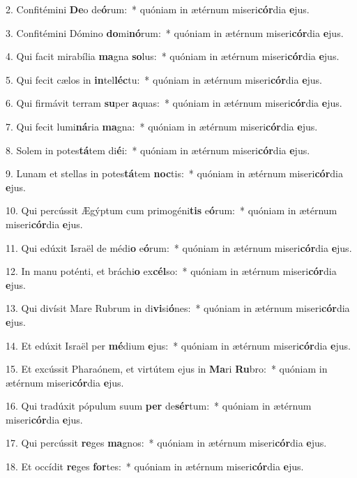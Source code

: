 2. Confitémini \textbf{De}o de\textbf{ó}rum:~*  quóniam in ætérnum miseri\textbf{cór}dia \textbf{e}jus.\

3. Confitémini Dómino \textbf{do}mi\textbf{nó}rum:~*  quóniam in ætérnum miseri\textbf{cór}dia \textbf{e}jus.\

4. Qui facit mirabília \textbf{ma}gna \textbf{so}lus:~*  quóniam in ætérnum miseri\textbf{cór}dia \textbf{e}jus.\

5. Qui fecit cælos in \textbf{in}tel\textbf{léc}tu:~*  quóniam in ætérnum miseri\textbf{cór}dia \textbf{e}jus.\

6. Qui firmávit terram \textbf{su}per \textbf{a}quas:~*  quóniam in ætérnum miseri\textbf{cór}dia \textbf{e}jus.\

7. Qui fecit lumi\textbf{ná}ria \textbf{ma}gna:~*  quóniam in ætérnum miseri\textbf{cór}dia \textbf{e}jus.\

8. Solem in potes\textbf{tá}tem di\textbf{é}i:~*  quóniam in ætérnum miseri\textbf{cór}dia \textbf{e}jus.\

9. Lunam et stellas in potes\textbf{tá}tem \textbf{noc}tis:~*  quóniam in ætérnum miseri\textbf{cór}dia \textbf{e}jus.\

10. Qui percússit Ægýptum cum primogéni\textbf{tis} e\textbf{ó}rum:~*  quóniam in ætérnum miseri\textbf{cór}dia \textbf{e}jus.\

11. Qui edúxit Israël de médi\textbf{o} e\textbf{ó}rum:~*  quóniam in ætérnum miseri\textbf{cór}dia \textbf{e}jus.\

12. In manu poténti, et bráchi\textbf{o} ex\textbf{cél}so:~*  quóniam in ætérnum miseri\textbf{cór}dia \textbf{e}jus.\

13. Qui divísit Mare Rubrum in di\textbf{vi}si\textbf{ó}nes:~*  quóniam in ætérnum miseri\textbf{cór}dia \textbf{e}jus.\

14. Et edúxit Israël per \textbf{mé}dium \textbf{e}jus:~*  quóniam in ætérnum miseri\textbf{cór}dia \textbf{e}jus.\

15. Et excússit Pharaónem, et virtútem ejus in \textbf{Ma}ri \textbf{Ru}bro:~*  quóniam in ætérnum miseri\textbf{cór}dia \textbf{e}jus.\

16. Qui tradúxit pópulum suum \textbf{per} de\textbf{sér}tum:~*  quóniam in ætérnum miseri\textbf{cór}dia \textbf{e}jus.\

17. Qui percússit \textbf{re}ges \textbf{ma}gnos:~*  quóniam in ætérnum miseri\textbf{cór}dia \textbf{e}jus.\

18. Et occídit \textbf{re}ges \textbf{for}tes:~*  quóniam in ætérnum miseri\textbf{cór}dia \textbf{e}jus.\

